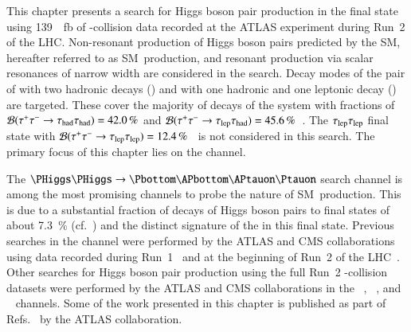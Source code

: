 This chapter presents a search for Higgs boson pair production in the \bbtautau
final state using \SI{139}{\per\femto\barn} of \pp-collision data recorded at
the ATLAS experiment during Run~2 of the LHC. Non-resonant production of Higgs
boson pairs predicted by the SM, hereafter referred to as SM~\HH production, and
resonant production via scalar resonances of narrow width are considered in the
search. Decay modes of the pair of \tauleptons with two hadronic \taulepton
decays (\hadhad) and with one hadronic and one leptonic \taulepton decay
(\lephad) are targeted. These cover the majority of decays of the \tautau system
with fractions of $\mathcal{B}(\tau^{+} \tau^{-} \to \tau_{\text{had}}\tau_{\text{had}}) = \SI{42.0}{\percent}$ and
$\mathcal{B}(\tau^{+} \tau^{-} \to \tau_{\text{lep}}\tau_{\text{had}}) =
\SI{45.6}{\percent}$~\cite{Zyla:2020zbs}. The $\tau_{\text{lep}}\tau_{\text{lep}}$ final state with
$\mathcal{B}(\tau^{+} \tau^{-} \to \tau_{\text{lep}}\tau_{\text{lep}}) =
\SI{12.4}{\percent}$~\cite{Zyla:2020zbs} is not considered in this search. The
primary focus of this chapter lies on the \hadhad channel.

The $\HH \to \bbtautau$ search channel is among the most promising channels to
probe the nature of SM~\HH production. This is due to a substantial fraction of
decays of Higgs boson pairs to \bbtautau final states of about
\SI{7.3}{\percent} (cf.~) and the distinct
signature of the \tauleptons in this final state. Previous searches in the
\bbtautau channel were performed by the ATLAS and CMS collaborations using data
recorded during Run~1~\cite{HIGG-2013-33,CMS-HIG-15-013} and at the beginning of
Run~2 of the LHC~\cite{HIGG-2016-16-witherratum,CMS-HIG-17-002}.  Other searches
for Higgs boson pair production using the full Run~2 \pp-collision datasets were
performed by the ATLAS and CMS collaborations in the
\bbtautau~\cite{CMS-PAS-HIG-20-010},
\bbbb~\cite{ATLAS-CONF-2022-035,CMS-HIG-20-005}, and
\bbyy~\cite{HDBS-2018-34,CMS-HIG-19-018} channels.
Some of the work presented in this chapter is published as part of
Refs.~\cite{ATLAS-CONF-2021-030,HDBS-2018-40} by the ATLAS collaboration.

